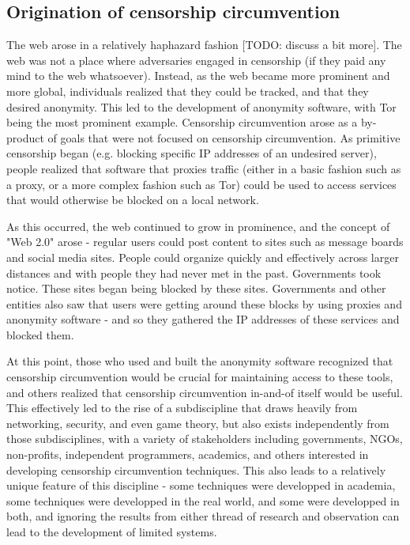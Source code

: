\documentclass[12pt]{report}
\begin{document}
\subsection{Origination of censorship circumvention}

The web arose in a relatively haphazard fashion [TODO: discuss a bit more]. The web was not a place where adversaries engaged in censorship (if they paid any mind to the web whatsoever). Instead, as the web became more prominent and more global, individuals realized that they could be tracked, and that they desired anonymity. This led to the development of anonymity software, with Tor being the most prominent example. Censorship circumvention arose as a by-product of goals that were not focused on censorship circumvention. As primitive censorship began (e.g. blocking specific IP addresses of an undesired server), people realized that software that proxies traffic (either in a basic fashion such as a proxy, or a more complex fashion such as Tor) could be used to access services that would otherwise be blocked on a local network.

As this occurred, the web continued to grow in prominence, and the concept of "Web 2.0" arose - regular users could post content to sites such as message boards and social media sites. People could organize quickly and effectively across larger distances and with people they had never met in the past. Governments took notice. These sites began being blocked by these sites. Governments and other entities also saw that users were getting around these blocks by using proxies and anonymity software - and so they gathered the IP addresses of these services and blocked them.

At this point, those who used and built the anonymity software recognized that censorship circumvention would be crucial for maintaining access to these tools, and others realized that censorship circumvention in-and-of itself would be useful. This effectively led to the rise of a subdiscipline that draws heavily from networking, security, and even game theory, but also exists independently from those subdisciplines, with a variety of stakeholders including governments, NGOs, non-profits, independent programmers, academics, and others interested in developing censorship circumvention techniques. This also leads to a relatively unique feature of this discipline - some techniques were developped in academia, some techniques were developped in the real world, and some were developped in both, and ignoring the results from either thread of research and observation can lead to the development of limited systems.
\end{document}
